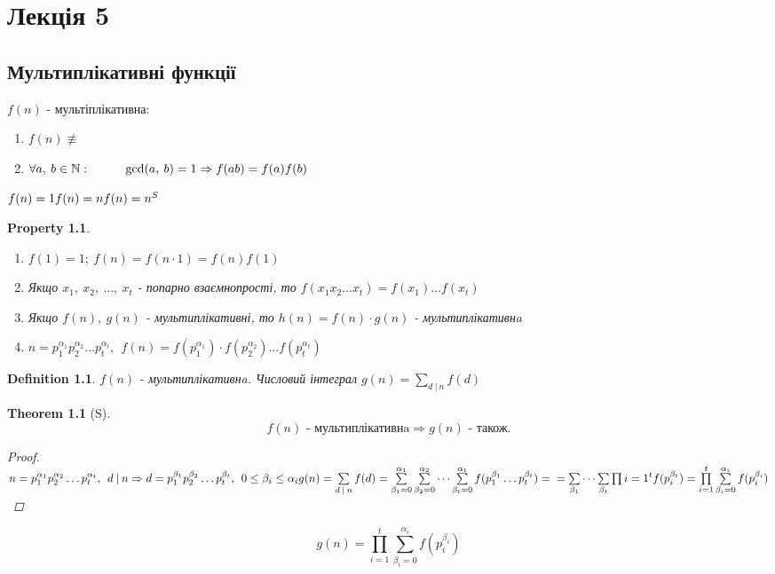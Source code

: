 \documentclass[a4paper,12pt]{bookest}
\newtheorem{theorem}{Theorem}[section]
\newtheorem{definition}{Definition}[section]
\newtheorem*{property*}{Property}
\newcommand\tab[1][1cm]{\hspace*{#1}}
\begin{document}
\chapter{Лекція 5}
\section{Мультиплікативні функції}
$f(n)$ - мультіплікативна:\begin{enumerate}
	\item $f(n)\not\equiv$
	\item $\forall a,\>b\in\mathbb{N}:\tab \gcd(a,\>b)=1\Rightarrow f(ab)=f(a)f(b)$
\end{enumerate}
\begin{example}
$\\f(n)=1\\f(n)=n\\f(n)=n^S$	
\end{example}
\begin{property*}$ $
	\begin{enumerate}
		\item $f(1)=1;\>f(n)=f(n\cdot 1)=f(n)f(1)$
		\item Якщо $x_1,\>x_2,\>\dots,\>x_t$ - попарно взаємнопрості, то $f(x_1 x_2 \dots x_t)=f(x_1)\dots f(x_t)$ 
		\item Якщо $f(n),\>g(n)$ - мультиплікативні, то $h(n)=f(n)\cdot g(n)$ -  мультиплікативнa
		\item $n=p_1^{\alpha_1}p_2^{\alpha_2}\dots p_t^{\alpha_t},\>\>f(n)=f(p_1^{\alpha_1})\cdot f(p_2^{\alpha_2})\dots f(p_t^{\alpha_t})$
	\end{enumerate}
\end{property*}
\begin{definition}
	$f(n)$ - мультиплікативнa. Числовий інтеграл $g(n)=\sum\limits_{d\>|\>n}f(d)$
\end{definition}
\begin{theorem}[S]
\label{S}
	$$f(n)\textrm{ - мультиплікативнa}\Rightarrow g(n) \textrm{ - також.}$$
	\begin{proof}
		$\\n=p_1^{\alpha_1}p_2^{\alpha_2}\dots p_t^{\alpha_t},\>\> d\>|\>n\Rightarrow d=p_1^{\beta_1}p_2^{\beta_2}\dots p_t^{\beta_t},\>\>0\leq \beta_i\leq\alpha_i\\g(n)= \sum\limits_{d\>|\>n}f(d)=\sum\limits_{\beta_1=0}^{\alpha_1}\sum\limits_{\beta_2=0}^{\alpha_2}\dots\sum\limits_{\beta_t=0}^{\alpha_t}f(p_1^{\beta_1}\dots p_t^{\beta_t})=\\=\sum\limits_{\beta_1}\dots\sum\limits_{\beta_t}\prod\limits{i=1}^{t}f(p_i^{\beta_t})=\prod\limits_{i=1}^{t}\sum\limits_{\beta_i=0}^{\alpha_i}f(p_i^{\beta_i})$
	\end{proof}
\end{theorem}
$$g(n)=\prod\limits_{i=1}^{t}\sum\limits_{\beta_i=0}^{\alpha_i}f(p_i^{\beta_i})$$
\end{document}
